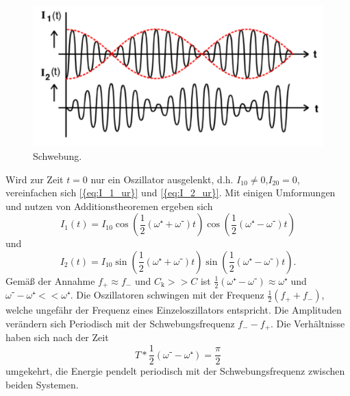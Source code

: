 \begin{figure}[h]
	\centering
	\label{fig:schwebung}
		\includegraphics[width=\textwidth]{Bilder/Schwebung.pdf}
		\caption{Schwebung.}
\end{figure}

Wird zur Zeit $t=0$ nur ein Oszillator ausgelenkt, d.h. $I_{10}\neq0$,$I_{20}=0$, vereinfachen sich \eqref{{eq:I_1_ur}} und \eqref{{eq:I_2_ur}}. 
Mit einigen Umformungen und nutzen von Additionstheoremen ergeben sich
\begin{equation}
	I_1(t)=I_{10}\cos(\frac{1}{2}(\omega⁺+\omega⁻)t)\cos(\frac{1}{2}(\omega⁺-\omega⁻)t)
\end{equation}
und
\begin{equation}
	I_2(t)=I_{10}\sin(\frac{1}{2}(\omega⁺+\omega⁻)t)\sin(\frac{1}{2}(\omega⁺-\omega⁻)t).
\end{equation}
Gemäß der Annahme $f_+\approx f_-$ und $C_\mathup{k}>>C$ ist $\frac{1}{2}(\omega⁺-\omega⁻)\approx\omega⁺$ und $\omega⁻-\omega⁺<<\omega⁺$.
Die Oszillatoren schwingen mit der Frequenz $\frac{1}{2}(f_+ + f_-)$, welche ungefähr der Frequenz eines Einzeloszillators entspricht. 
Die Amplituden verändern sich Periodisch mit der Schwebungsfrequenz $f_- - f_+$. 
Die Verhältnisse haben sich nach der Zeit 
\begin{equation}
T*\frac{1}{2}({\omega⁻-\omega⁺})=\frac{\pi}{2}
\end{equation}
 umgekehrt, die Energie pendelt periodisch mit der Schwebungsfrequenz zwischen beiden Systemen.

\newpage
